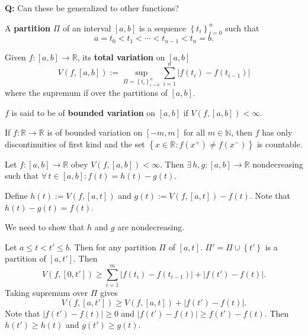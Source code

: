 \documentclass{notes}
\begin{document}
  {\boldmath \bfseries  Q:} Can these be generalized to other functions?

  \begin{defn}
    A {\boldmath \bfseries partition} $\Pi$ of an interval $[a, b]$ is a sequence $\left \{ t_i \right \}_{i = 0}^n$ such that 
    \[
      a = t_0 < t_{1} < \cdots < t_{n - 1} < t_n = b.
    \]
  \end{defn}
  
  \begin{defn}
    Given $f \colon [a, b] \to \mathbb R$, its {\boldmath \bfseries total variation} on $[a, b]$
    \[
      V(f, [a, b]) := \sup_{\Pi = \left \{ t_i \right \}_{i = 0}^n} \sum_{i = 1}^n \left | f(t_i) - f(t_{i - 1}) \right | 
    \]
    where the supremum if over the partitions of $[a, b]$.
  \end{defn}
  
  \begin{defn}
    $f$ is said to be of {\boldmath \bfseries bounded variation} on $[a, b]$ if $V(f, [a, b]) < \infty$.
  \end{defn}
  
  \begin{lem}
    If $f \colon \mathbb R \to \mathbb R$ is of bounded variation on $[-m, m]$ for all $m \in \mathbb N$, then $f$ has only discontinuities of first kind and the set $\left \{ x \in \mathbb R : f(x^+) \neq f(x^-) \right \}$ is countable.
  \end{lem}
  
  \begin{thm}
    Let $f \colon [a, b] \to \mathbb R$ obey $V(f, [a, b]) < \infty$.
    Then $\exists \, h, g \colon [a, b] \to \mathbb R$ nondecreasing such that $\forall \, t \in [a, b]: f(t) = h(t) - g(t)$.
  \end{thm}
  
  \begin{prf}
    Define $h(t) := V(f, [a, t])$ and $g(t) := V(f, [a, t]) - f(t)$.
    Note that $h(t) - g(t) = f(t)$.

    We need to show that $h$ and $g$ are nondecreasing.
    
    Let $a \leq t < t' \leq b$.
    Then for any partition $\Pi$ of $[a, t]$.
    $\Pi' = \Pi \cup \left \{ t' \right \}$ is a partition of $[a, t']$.
    Then 
    \begin{equation}
      V(f, [0, t']) \geq \sum_{i = 1}^m \left | f(t_i) - f(t_{i - 1}) \right | + \left | f(t') - f(t) \right |.
    \end{equation}
    Taking supremum over $\Pi$ gives 
    \begin{equation}
      V(f, [a, t']) \geq V(f, [a, t]) + \left | f(t') - f(t) \right |.
    \end{equation}
    Note that $\left | f(t') - f(t) \right | \geq 0$ and $\left | f(t') - f(t) \right | \geq f(t') - f(t)$.
    Then $h(t') \geq h(t)$ and $g(t') \geq g(t)$.
  \end{prf}
  
\end{document}
